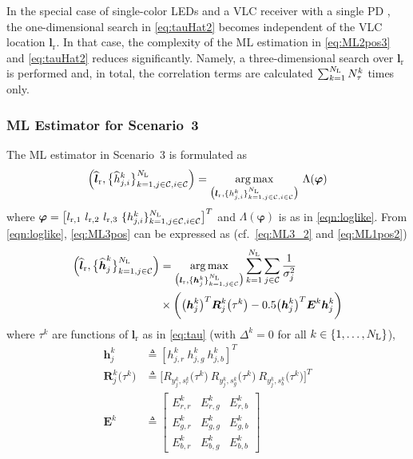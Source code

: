 \documentclass[10pt,twocolumn]{IEEEtran}
\newcommand{\NL}{N_{\rm{L}}}
\newcommand{\bvp}{{\boldsymbol{\varphi}}}
\newcommand{\mtC}{{\mathcal{C}}}
\newcommand{\lr}{{\boldsymbol{l}_{\mathrm{r}}}}
\newcommand{\lrh}{{\widehat{\boldsymbol{l}}_{\mathrm{r}}}}
\newcommand{\lrs}[1]{{l_{\mathrm{r},#1}}}
\newcommand{\hjk}{{\boldsymbol{h}}^{k}_{j}}
\newcommand{\hjkh}{\widehat{{\boldsymbol{h}}}^{k}_{j}}
\newcommand{\Rjk}{{\boldsymbol{R}}^{k}_{j}}
\newcommand{\Ek}{{\boldsymbol{E}}^{k}}
\begin{document}
In the special case of single-color LEDs and a VLC receiver with a single PD \cite[Sec.~IV-B]{Direct_TCOM}, the one-dimensional search in \eqref{eq:tauHat2} becomes independent of the VLC location $\lr$. In that case, the complexity of the ML estimation in \eqref{eq:ML2pos3} and \eqref{eq:tauHat2} reduces significantly. Namely, a three-dimensional search over $\lr$ is performed and, in total, the correlation terms are calculated $\sum_{k=1}^{\NL}N^k_{\tau}$ times only.


\subsubsection{ML Estimator for Scenario~3}\label{sec:ML3pos}

The ML estimator in Scenario~3 is formulated as
\begin{gather}\label{eq:ML3pos}
\Big(\lrh,\big\{\widehat{h}^k_{j,i}\big\}_{k=1,j\in{\mtC},i\in{\mtC}}^{\NL}\Big)=
\underset{\big(\lr,\{h^k_{j,i}\}_{k=1,j\in{\mtC},i\in{\mtC}}^{\NL}\big)}{\arg\max}~\Lambda(\bvp)
\end{gather}
where $\bvp=\big[\lrs{1}~\lrs{2}~\lrs{3}~\{{h}^k_{j,i}\}_{k=1,j\in{\mtC},i\in{\mtC}}^{\NL}\big]^T$ and $\Lambda(\bvp)$ is as in \eqref{eqn:loglike}. From \eqref{eqn:loglike}, \eqref{eq:ML3pos} can be expressed as (cf.~\eqref{eq:ML3_2} and \eqref{eq:ML1pos2})
\begin{align}\label{eq:ML3pos2}
\Big(\lrh,\big\{\hjkh\big\}_{k=1,j\in{\mtC}}^{\NL}\Big)
&=\underset{\big(\lr,\{\hjk\}_{k=1,j\in{\mtC}}^{\NL}\big)}
{\arg\max}\sum_{k=1}^{\NL}\sum_{j\in{\mtC}}\frac{1}{\sigma_j^2}
\\\nonumber
&\times\bigg(\big(\hjk\big)^T\Rjk\big(\tau^k\big)-0.5\big(\hjk\big)^T\Ek\hjk\bigg)
\end{align}
where $\tau^k$ are functions of $\lr$ as in \eqref{eq:tau} (with $\Delta^k=0$ for all $k\in\{1,\ldots,\NL\}$),
\begin{align}\label{eq:ML3posDefs}
\hjk&\triangleq[h^k_{j,r}~h^k_{j,g}~h^k_{j,b}]^T\\
\Rjk\big(\tau^k\big)&\triangleq\big[R_{y^k_j,s^k_r}\big(\tau^k\big)~R_{y^k_j,s^k_g}\big(\tau^k\big)
~R_{y^k_j,s^k_b}\big(\tau^k\big)\big]^T\\
\Ek&\triangleq\begin{bmatrix}
E^k_{r,r}&E^k_{r,g}&E^k_{r,b}\\
E^k_{g,r}&E^k_{g,g}&E^k_{g,b}\\
E^k_{b,r}&E^k_{b,g}&E^k_{b,b}
\end{bmatrix}
\end{align}
\end{document}
